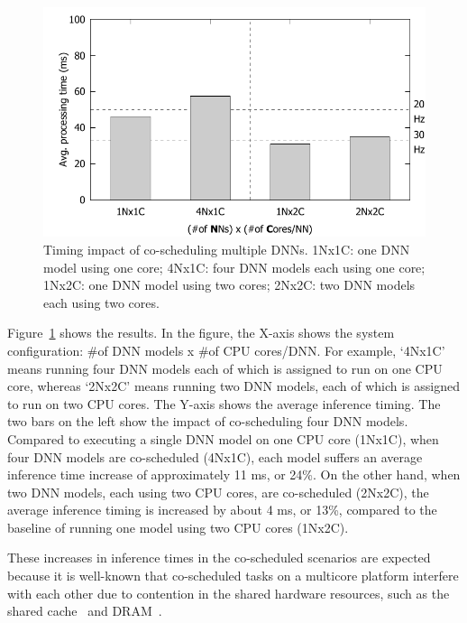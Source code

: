 \begin{figure}[h]
  \centering
  \includegraphics[width=.45\textwidth]{figs/perf_vs_modelcnt}
  \caption{Timing impact of co-scheduling multiple DNNs. 1Nx1C: one DNN
    model using one core; 4Nx1C: four DNN models each using one core;
    1Nx2C: one DNN model using two cores; 2Nx2C: two DNN models each
    using two cores.} 
  \label{fig:perf-vs-modelcnt}
\end{figure}

Figure~\ref{fig:perf-vs-modelcnt} shows the results. In the figure, the
X-axis shows the system configuration: \#of DNN models x \#of CPU
cores/DNN. For example, `4Nx1C' means running four DNN models each of
which is assigned to run on one CPU core, whereas `2Nx2C' means running
two DNN models, each of which is assigned to run on two CPU
cores. The Y-axis shows the average inference timing.
The two bars on the left show the impact of co-scheduling four DNN
models. Compared to executing a single DNN model on one CPU core
(1Nx1C), when four DNN models are co-scheduled (4Nx1C), each model
suffers an average inference time increase of approximately 11 ms,
or 24\%. On the other hand, when two DNN models, each using two CPU
cores, are co-scheduled (2Nx2C), the average inference timing is increased by
about 4 ms, or 13\%, compared to the baseline of running one model
using two CPU cores (1Nx2C). 

These increases in inference times in the co-scheduled scenarios are
expected because it is well-known that co-scheduled tasks on a
multicore platform interfere with each other due to contention in the
shared hardware resources, such as the shared
cache~\cite{Gracioli2015} and DRAM~\cite{Yun2013}.


